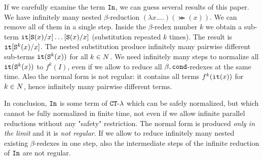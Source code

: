 If we carefully examine the term ${\tt In}$, we can guess several results of this paper.
We have infinitely many nested $\beta$-reduction $(\lambda x. \ldots)(\Succ (x))$.
We can remove all of them in a single step. Inside the $\beta$-redex number $k$ we obtain a sub-term
${\tt it}[{\tt S} (x)/x]\ldots[{\tt S} (x)/x]$ (substitution repeated $k$ times).
The result is ${\tt it}[{\tt S} ^k(x)/x] $.
The nested substitution produce infinitely many pairwise different sub-terms 
${\tt it}({\tt S} ^k(x))$ for all $k \in {N}$.
We need infinitely many steps to normalize all ${\tt it}({\tt S} ^k(x))$ to $f^k(I)$, 
even if we allow to reduce all $\beta,{\tt cond}$-redexes at the same time.
Also the normal form is not regular: it contains all terms $f^k({\tt it}(x))$ for $k \in {N}$, hence
infinitely many pairwise different terms. 

In conclusion, 
${\tt In}$ is some term of ${ {\tt CT}\mbox{-}\lambda}$ which can be safely normalized, but which 
cannot be fully normalized in finite time, not even if we allow
infinite parallel reductions without any "safety" restriction. 
The normal form is produced \emph{only in the limit}
and it is \emph{not regular}. If we allow to reduce infinitely many nested existing
$\beta$-redexes in one step, also
the intermediate steps of the infinite reduction of ${\tt In}$ are not regular.



